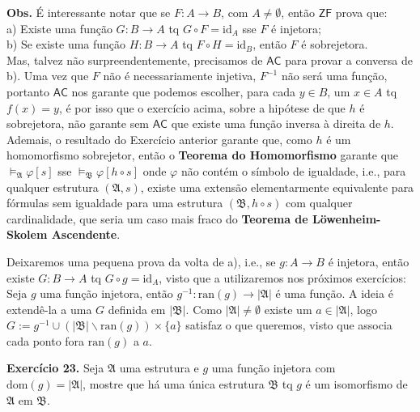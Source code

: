 \documentclass[11pt]{article}
\newcommand{\mf}[1]{\mathfrak{#1}}
\newcommand{\msf}[1]{\mathsf{#1}}
\begin{document}
\begin{shaded}
\textbf{Obs.} É interessante notar que se $F:A\to B$, com $A\neq\emptyset$, então $\msf{ZF}$ prova que:\\
a) Existe uma função $G:B\to A$ tq $G\circ F=\text{id}_A$ sse $F$ é injetora;\\
b) Se existe uma função $H:B\to A$ tq $F\circ H=\text{id}_B$, então $F$ é sobrejetora.\\
Mas, talvez não surpreendentemente, precisamos de $\msf{AC}$ para provar a conversa de b). Uma vez que $F$ não é necessariamente injetiva, $F^{-1}$ não será uma função, portanto $\msf{AC}$ nos garante que podemos escolher, para cada $y\in B$, um $x\in A$ tq $f(x)=y$, é por isso que o exercício acima, sobre a hipótese de que $h$ é sobrejetora, não garante sem $\msf{AC}$ que existe uma função inversa à direita de $h$.\\
Ademais, o resultado do Exercício anterior garante que, como $h$ é um homomorfismo sobrejetor, então o \textbf{Teorema do Homomorfismo} garante que $\vDash_\mf{A}\varphi[s]$ sse $\vDash_\mf{B}\varphi[h\circ s]$ onde $\varphi$ não contém o símbolo de igualdade, i.e., para qualquer estrutura $(\mf{A},s)$, existe uma extensão elementarmente equivalente para fórmulas sem igualdade para uma estrutura $(\mf{B},h\circ s)$ com qualquer cardinalidade, que seria um caso mais fraco do \textbf{Teorema de Löwenheim-Skolem Ascendente}.

Deixaremos uma pequena prova da volta de a), i.e., se $g:A\to B$ é injetora, então existe $G:B\to A$ tq $G\circ g=\text{id}_A$, visto que a utilizaremos nos próximos exercícios:\\
Seja $g$ uma função injetora, então $g^{-1}:\text{ran}(g)\to|\mf{A}|$ é uma função. A ideia é extendê-la a uma $G$ definida em $|\mf{B}|$. Como $|\mf{A}|\neq\emptyset$ existe um $a\in|\mf{A}|$, logo $G:=g^{-1}\cup(|\mf{B}|\backslash\text{ran}(g))\times\{a\}$ satisfaz o que queremos, visto que associa cada ponto fora $\text{ran}(g)$ a $a$.
\end{shaded}

\begin{shaded}
\textbf{Exercício 23.} Seja $\mf{A}$ uma estrutura e $g$ uma função injetora com $\text{dom}(g)=|\mf{A}|$, mostre que há uma única estrutura $\mf{B}$ tq $g$ é um isomorfismo de $\mf{A}$ em $\mf{B}$.
\end{shaded}
\end{document}
